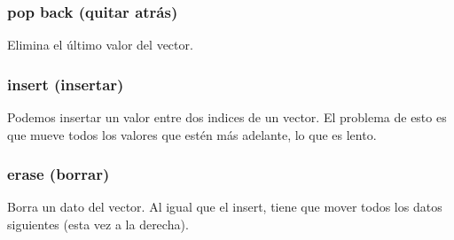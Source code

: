 \documentclass[letterpaper,10pt,spanish]{sphinxmanual}
\begin{document}
\subsubsection{pop back (quitar atrás)}
\label{\detokenize{edd/lineales:pop-back-quitar-atras}}
Elimina el último valor del vector.

\begin{sphinxVerbatim}[commandchars=\\\{\},numbers=left,firstnumber=1,stepnumber=1]
\end{sphinxVerbatim}


\subsubsection{insert (insertar)}
\label{\detokenize{edd/lineales:insert-insertar}}
Podemos insertar un valor entre dos indices de un vector. El problema de esto es que mueve todos los valores que estén más adelante, lo que es lento.

\begin{sphinxVerbatim}[commandchars=\\\{\},numbers=left,firstnumber=1,stepnumber=1]
       
\end{sphinxVerbatim}


\subsubsection{erase (borrar)}
\label{\detokenize{edd/lineales:erase-borrar}}
Borra un dato del vector. Al igual que el insert, tiene que mover todos los datos siguientes (esta vez a la derecha).

\begin{sphinxVerbatim}[commandchars=\\\{\},numbers=left,firstnumber=1,stepnumber=1]
      
\end{sphinxVerbatim}
\end{document}
